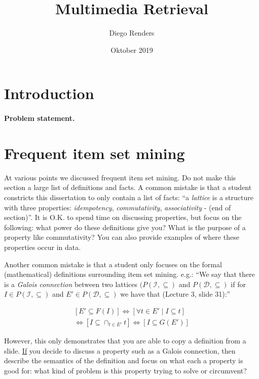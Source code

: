 \documentclass{bigdata}
\title{Multimedia Retrieval}
\author{Diego Renders}
\date{Oktober 2019}
\begin{document}
\maketitle

\section{Introduction}

\paragraph*{Problem statement.}

\newpage

\section{Frequent item set mining}

At various points we discussed frequent item set mining. Do not make this section a large list of definitions and facts. A common mistake is that a student constricts this dissertation to only contain a list of facts: ``a \emph{lattice} is a structure with three properties: \emph{idempotency}, \emph{commutativity}, \emph{associativity} - (end of section)''. It is O.K. to spend time on discussing properties, but focus on the following: what power do these definitions give you? What is the purpose of a property like commutativity? You can also provide examples of where these properties occur in data.

Another common mistake is that a student only focuses on the formal (mathematical) definitions surrounding item set mining. e.g.: ``We say that there is a \emph{Galois connection} between two lattices $(P(\mathcal{I}, \subseteq)$ and $P(\mathcal{D}, \subseteq)$ if for $I \in P(\mathcal{I}, \subseteq)$ and $E' \in P(\mathcal{D}, \subseteq)$ we have that (Lecture 3, slide 31):'' 

\begin{align*}
    \left[    E' \subseteq F(I)    \right] \Leftrightarrow \left[  \forall t \in E' \mid I \subseteq t   \right] \\
    \Leftrightarrow    \left[ I \subseteq \cap_{t \in E'} t    \right] \Leftrightarrow \left[ I \subseteq  G(E')  \right]
\end{align*}

However, this only demonstrates that you are able to copy a definition from a slide. \underline{If} you decide to discuss a property such as a Galois connection, then describe the semantics of the definition and focus on what each a property is good for: what kind of problem is this property trying to solve or circumvent? 
\end{document}
